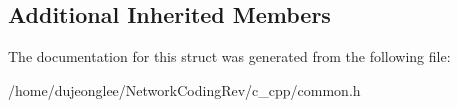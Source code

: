 \subsection*{Additional Inherited Members}


The documentation for this struct was generated from the following file\+:\begin{DoxyCompactItemize}
\item 
/home/dujeonglee/\+Network\+Coding\+Rev/c\+\_\+cpp/common.\+h\end{DoxyCompactItemize}
